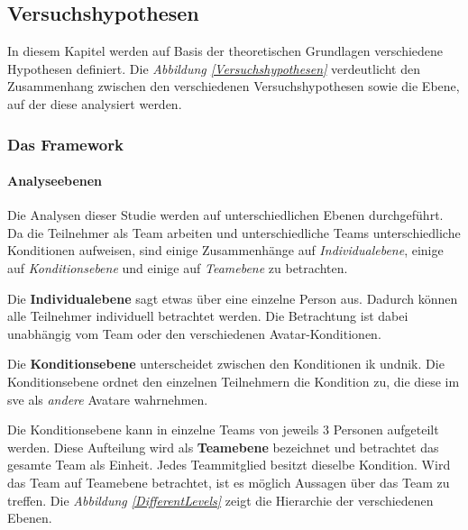 \documentclass[a4paper,11pt]{article}%
\renewcommand{\\}{\vspace*{0.5\baselineskip} \newline}
\begin{document}
\subsection{Versuchshypothesen}
In diesem Kapitel werden auf Basis der theoretischen Grundlagen verschiedene Hypothesen definiert.
Die \textit{Abbildung \ref{Versuchshypothesen}} verdeutlicht den Zusammenhang zwischen den verschiedenen Versuchshypothesen sowie die Ebene, auf der diese analysiert werden.
\subsubsection{Das Framework}

\paragraph{Analyseebenen}
Die Analysen dieser Studie werden auf unterschiedlichen Ebenen durchgeführt.
Da die Teilnehmer als Team arbeiten und unterschiedliche Teams unterschiedliche Konditionen aufweisen, sind einige Zusammenhänge auf \textit{Individualebene}, einige auf \textit{Konditionsebene} und einige auf \textit{Teamebene} zu betrachten.

Die \textbf{Individualebene} sagt etwas über eine einzelne Person aus. Dadurch können alle Teilnehmer individuell betrachtet werden. Die Betrachtung ist dabei unabhängig vom Team oder den verschiedenen Avatar-Konditionen. 

Die \textbf{Konditionsebene} unterscheidet zwischen den Konditionen \ac{ik} und\newline \ac{nik}. Die Konditionsebene ordnet den einzelnen Teilnehmern die Kondition zu, die diese im \ac{sve} als \textit{andere} Avatare wahrnehmen. 

Die Konditionsebene kann in einzelne Teams von jeweils 3 Personen aufgeteilt werden. Diese Aufteilung wird als \textbf{Teamebene} bezeichnet und betrachtet das gesamte Team als Einheit. Jedes Teammitglied besitzt dieselbe Kondition. Wird das Team auf Teamebene betrachtet, ist es möglich Aussagen über das Team zu treffen. 
Die \textit{Abbildung \ref{DifferentLevels}} zeigt die Hierarchie der verschiedenen Ebenen.
\end{document}

